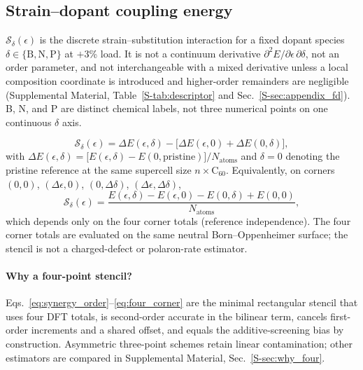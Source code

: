 \subsection{Strain--dopant coupling energy}
\label{sec:methods_coupling}

$\mathcal{S}_\delta(\epsilon)$ is the discrete strain--substitution interaction for a fixed dopant species $\delta\in\{\mathrm{B},\mathrm{N},\mathrm{P}\}$ at $+3$\% load.
It is not a continuum derivative $\partial^2 E/\partial\epsilon\,\partial\delta$, not an order parameter, and not interchangeable with a mixed derivative unless a local composition coordinate is introduced and higher-order remainders are negligible (Supplemental Material, Table~\ref{S-tab:descriptor} and Sec.~\ref{S-sec:appendix_fd}).
B, N, and P are distinct chemical labels, not three numerical points on one continuous $\delta$ axis.

\begin{equation}
\mathcal{S}_\delta(\epsilon)
= \Delta E(\epsilon,\delta) - \bigl[\Delta E(\epsilon,0) + \Delta E(0,\delta)\bigr],
\label{eq:synergy_order}
\end{equation}
with
$\Delta E(\epsilon,\delta)=\bigl[E(\epsilon,\delta)-E(0,\mathrm{pristine})\bigr]/N_{\mathrm{atoms}}$
and $\delta{=}0$ denoting the pristine reference at the same supercell size $n\times\mathrm{C}_{60}$.
Equivalently, on corners $(0,0)$, $(\Delta\epsilon,0)$, $(0,\Delta\delta)$, $(\Delta\epsilon,\Delta\delta)$,
\begin{equation}
\mathcal{S}_\delta(\epsilon)=\frac{E(\epsilon,\delta)-E(\epsilon,0)-E(0,\delta)+E(0,0)}{N_{\mathrm{atoms}}},
\label{eq:four_corner}
\end{equation}
which depends only on the four corner totals (reference independence).
The four corner totals are evaluated on the same neutral Born--Oppenheimer surface; the stencil is not a charged-defect or polaron-rate estimator.

\paragraph{Why a four-point stencil?}
Eqs.~\eqref{eq:synergy_order}--\eqref{eq:four_corner} are the minimal rectangular stencil that uses four DFT totals, is second-order accurate in the bilinear term, cancels first-order increments and a shared offset, and equals the additive-screening bias by construction.
Asymmetric three-point schemes retain linear contamination; other estimators are compared in Supplemental Material, Sec.~\ref{S-sec:why_four}.


